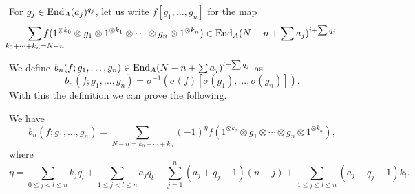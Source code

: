\documentclass[Thesis.tex]{subfiles}
\begin{document}
For $g_j\in \operatorname{End}_A(a_j)^{q_j}$, let us write $f[g_1,\dots, g_n]$ for the map 
\[\sum_{\mathclap{k_0+\cdots+k_n=N-n}}f(1^{\otimes k_0}\otimes g_1\otimes 1^{\otimes k_1}\otimes\cdots\otimes g_n\otimes 1^{\otimes k_n})\in \End_A(N-n+\sum a_j)^{i+\sum q_j}\]

We define $b_n(f;g_1,\dots, g_n)\in \operatorname{End}_A(N-n+\sum a_j)^{i+\sum q_j}$ as
\[b_n(f;g_1,\dots, g_n)=\sigma^{-1}(\sigma(f)[\sigma(g_1),\dots, \sigma(g_n)]).\]
With this the definition we can prove the following.
\begin{lem}
 We have
\[b_n(f;g_1,\dots,g_n)=\sum_{N-n=k_0+\cdots+k_n} (-1)^\eta
f(1^{\otimes k_0}\otimes g_1\otimes \cdots\otimes g_n\otimes1^{\otimes k_n}),\]
where 
\[\eta=\sum_{0\leq j<l\leq n}k_jq_l+\sum_{1\leq j<l\leq n}a_jq_l+\sum_{j=1}^n (a_j+q_j-1)(n-j)+\sum_{1\leq j\leq l\leq n} (a_j+q_j-1)k_l.\]
\end{lem} 


 
\end{document}
